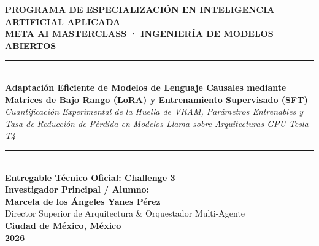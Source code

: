 \documentclass[12pt,letterpaper]{article}
\begin{document}
\begin{titlepage}
  \centering
  \vspace*{1.5cm}
  
  {\Large\textbf{PROGRAMA DE ESPECIALIZACIÓN EN INTELIGENCIA ARTIFICIAL APLICADA}}\\[0.8cm]
  {\large\textbf{META AI MASTERCLASS · INGENIERÍA DE MODELOS ABIERTOS}}\\[1.5cm]
  
  \rule{\linewidth}{0.6mm}\\[0.5cm]
  {\LARGE\textbf{Adaptación Eficiente de Modelos de Lenguaje Causales mediante Matrices de Bajo Rango (LoRA) y Entrenamiento Supervisado (SFT)}}\\[0.3cm]
  {\large\textit{Cuantificación Experimental de la Huella de VRAM, Parámetros Entrenables y Tasa de Reducción de Pérdida en Modelos Llama sobre Arquitecturas GPU Tesla T4}}\\[0.2cm]
  \rule{\linewidth}{0.6mm}\\[2cm]
  
  \textbf{Entregable Técnico Oficial: Challenge 3}\\[0.8cm]
  
  \textbf{Investigador Principal / Alumno:}\\
  {\Large\textbf{Marcela de los Ángeles Yanes Pérez}}\\[0.3cm]
  {\small Director Superior de Arquitectura \& Orquestador Multi-Agente}\\[2.5cm]
  
  \textbf{Ciudad de México, México}\\[0.2cm]
  \textbf{2026}
\end{titlepage}

\newpage
\tableofcontents
\newpage

\end{document}
